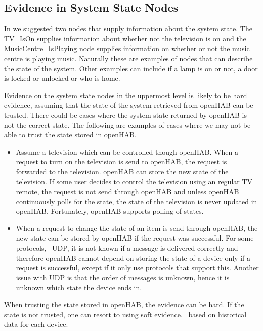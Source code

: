 \subsection{Evidence in System State Nodes}
\label{sec:design:bayesian-network:system-state-nodes-evidence}

In  we suggested two nodes that supply information about the system state. The TV\_IsOn supplies information about whether not the television is on and the MusicCentre\_IsPlaying node supplies information on whether or not the music centre is playing music. Naturally these are examples of nodes that can describe the state of the system. Other examples can include if a lamp is on or not, a door is locked or unlocked or who is home.

Evidence on the system state nodes in the uppermost level is likely to be hard evidence, assuming that the state of the system retrieved from openHAB can be trusted. There could be cases where the system state returned by openHAB is not the correct state. The following are examples of cases where we may not be able to trust the state stored in openHAB.

\begin{itemize}
\item Assume a television which can be controlled though openHAB. When a request to turn on the television is send to openHAB, the request is forwarded to the television. openHAB can store the new state of the television. If some user decides to control the television using an regular TV remote, the request is not send through openHAB and unless openHAB continuously polls for the state, the state of the television is never updated in openHAB. Fortunately, openHAB supports polling of states.
\item When a request to change the state of an item is send through openHAB, the new state can be stored by openHAB if the request was successful. For some protocols, \eg~UDP, it is not known if a message is delivered correctly and therefore openHAB cannot depend on storing the state of a device only if a request is successful, except if it only use protocols that support this. Another issue with UDP is that the order of messages is unknown, hence it is unknown which state the device ends in.
\end{itemize}

When trusting the state stored in openHAB, the evidence can be hard. If the state is not trusted, one can resort to using soft evidence. \eg~based on historical data for each device.

